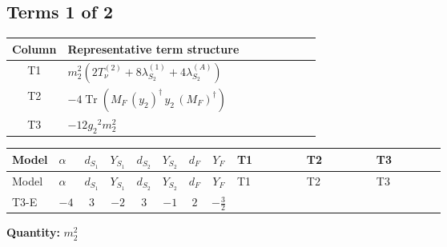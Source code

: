 \documentclass[8pt]{article}
\begin{document}
\begin{landscape}
\subsection*{Terms 1 of 2}
\begin{center}
\begin{tabular}{@{}c >{\raggedright\arraybackslash}p{0.82\linewidth}@{}}
\toprule
Column & Representative term structure \\
\midrule
T1 & \(\displaystyle {m_2^2} (2 T_{\nu}^{(2)}+8 {\lambda_{S_2}^{(1)}}+4 {\lambda_{S_2}^{(A)}})\) \\
\midrule
T2 & \(\displaystyle -4 \operatorname{Tr}\!\left({M_F}\,\left({y_2}\right)^{\dagger}\,{y_2}\,\left({M_F}\right)^{\dagger}\right)\) \\
\midrule
T3 & \(\displaystyle -12 {g_2}^2 {m_2^2}\) \\
\midrule
\bottomrule
\end{tabular}
\end{center}
\smallskip
\tiny
\begin{longtable}{@{}llcccccc >{\raggedright\arraybackslash}p{0.21\linewidth} >{\raggedright\arraybackslash}p{0.21\linewidth} >{\raggedright\arraybackslash}p{0.21\linewidth}@{}}
\toprule
Model & $\alpha$ & $d_{S_1}$ & $Y_{S_1}$ & $d_{S_2}$ & $Y_{S_2}$ & $d_F$ & $Y_F$ & T1 & T2 & T3 \\
\midrule
\endfirsthead
\toprule
Model & $\alpha$ & $d_{S_1}$ & $Y_{S_1}$ & $d_{S_2}$ & $Y_{S_2}$ & $d_F$ & $Y_F$ & T1 & T2 & T3 \\
\midrule
\endhead
T3-E & $-4$ & $3$ & $-2$ & $3$ & $-1$ & $2$ & $-\frac{3}{2}$ & \scriptsize\adjustbox{max width=\linewidth}{$\begin{gathered} {m_2^2} (2 T_{\nu}^{(2)}+8 {\lambda_{S_2}^{(1)}}+4 {\lambda_{S_2}^{(A)}})\end{gathered}$} & \scriptsize\adjustbox{max width=\linewidth}{$\begin{gathered} -4 \operatorname{Tr}\!\left({M_F}\,\left({y_2}\right)^{\dagger}\,{y_2}\,\left({M_F}\right)^{\dagger}\right)\end{gathered}$} & \scriptsize\adjustbox{max width=\linewidth}{$\begin{gathered} -12 {g_2}^2 {m_2^2}\end{gathered}$} \\
\midrule
\bottomrule
\end{longtable}
\clearpage
\noindent\textbf{Quantity: }$m_2^2$\par\smallskip

\end{landscape}
\end{document}
